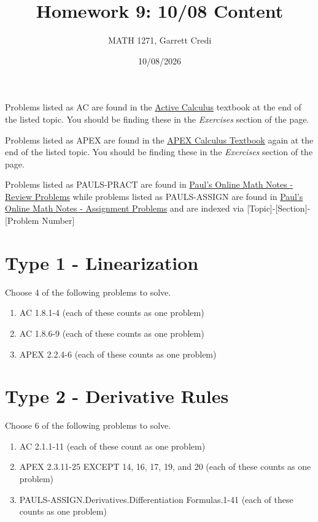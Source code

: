 \documentclass[12pt]{article}
\title{Homework 9: 10/08 Content}
\author{MATH 1271, Garrett Credi}
\date{10/08/2026}
\begin{document}
\maketitle

Problems listed as AC are found in the \href{https://activecalculus.org/single1e/frontmatter.html}{Active Calculus} 
textbook at the end of the listed topic. You should be finding these in the \textit{Exercises} section of the page.

Problems listed as APEX are found in the \href{https://opentext.uleth.ca/apex-calculus/apex-calculus.html}{APEX Calculus Textbook}
again at the end of the listed topic. You should be finding these in the \textit{Exercises} section of the page.

Problems listed as PAULS-PRACT are found in \href{https://tutorial.math.lamar.edu/Problems/CalcI/CalcI.aspx}{Paul's Online Math Notes - Review Problems}
while problems listed as PAULS-ASSIGN are found in \href{https://tutorial.math.lamar.edu/ProblemsNS/CalcI/CalcI.aspx}{Paul's Online Math Notes - Assignment Problems}
and are indexed via [Topic]-[Section]-[Problem Number]

\section{Type 1 - Linearization}

Choose 4 of the following problems to solve.

\begin{enumerate}
  \item AC 1.8.1-4 (each of these counts as one problem)
  \item AC 1.8.6-9 (each of these counts as one problem)
  \item APEX 2.2.4-6 (each of these counts as one problem)
\end{enumerate}

\section{Type 2 - Derivative Rules}
Choose 6 of the following problems to solve.

\begin{enumerate}
  \item AC 2.1.1-11 (each of these count as one problem) 
  \item APEX 2.3.11-25 EXCEPT 14, 16, 17, 19, and 20 (each of these counts as one problem)
  \item PAULS-ASSIGN.Derivatives.Differentiation Formulas.1-41 (each of these counts as one problem)
\end{enumerate}
\end{document}
